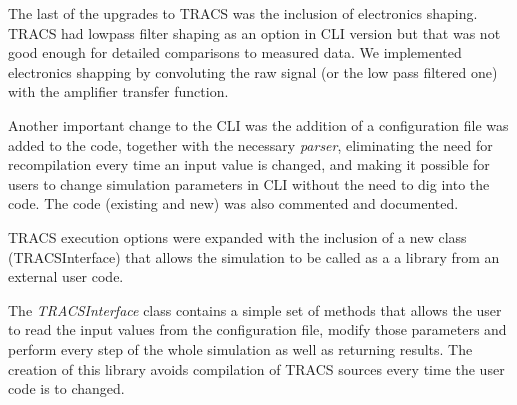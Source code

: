 The last of the upgrades to TRACS was the inclusion of electronics shaping. TRACS had lowpass filter shaping as an option in CLI version but that was not good enough for detailed comparisons to measured data. We implemented electronics shapping by convoluting the raw signal (or the low pass filtered one) with the amplifier transfer function. %



Another important change to the CLI was the addition of a configuration file was added to the code, together with the necessary \textit{parser}, eliminating the need for recompilation every time an input value is changed, and making it possible for users to change simulation parameters in CLI without the need to dig into the code. The code (existing and new) was also commented and documented.

TRACS execution options were expanded with the inclusion of a new class (TRACSInterface) that allows the simulation to be called as a a library from an external user code.


The \textit{TRACSInterface} class contains a simple set of methods that allows the user to read the input values from the configuration file, modify those parameters and perform every step of the whole simulation as well as returning results. The creation of this library avoids compilation of TRACS sources every time the user code is to changed.

